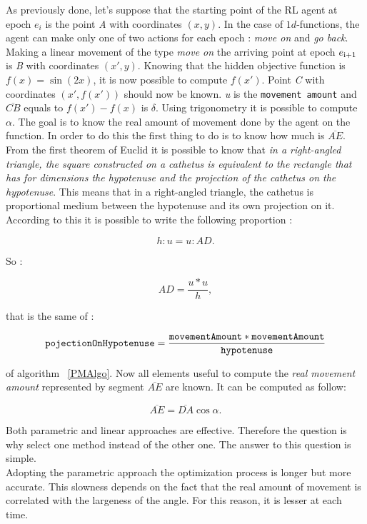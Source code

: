 As previously done, let's suppose that the starting point of the RL agent at epoch $e_i$ is the point \textit{A} with coordinates $(x, y)$. In the case of $1d$-functions, the agent can make only one of two actions for each epoch : \textit{move on} and \textit{go back}. Making a linear movement of the type \textit{move on} the arriving point at epoch $e\textsubscript{i+1}$ is \textit{B} with coordinates $(x', y)$. Knowing that the hidden objective function is $f(x) = \sin(2x)$, it is now possible to compute $f(x')$. Point \textit{C} with coordinates $(x', f(x'))$ should now be known. \textit{u} is the {\tt movement amount} and $\overline{CB}$  equals to $f(x') - f(x)$ is $\delta$. Using trigonometry it is possible to compute $\alpha$. The goal is to know the real amount of movement done by the agent on the function. In order to do this the first thing to do is to know how much is $\overline{AE}$.  From the first theorem of Euclid it is possible to know that \textit{in a right-angled triangle, the square constructed on a cathetus is equivalent to the rectangle that has for dimensions the hypotenuse and the projection of the cathetus on the hypotenuse}. This means that in a right-angled triangle, the cathetus is proportional medium between the hypotenuse and its own projection on it. According to this it is possible to write the following proportion :

\begin{equation}
	h : u =  u : AD.
\end{equation}

So :

\begin{equation}
	AD = \dfrac{u * u}{h},
\end{equation}

that is the same of :

\begin{equation}
	 {\tt pojectionOnHypotenuse} = \dfrac{{\tt movementAmount} * {\tt movementAmount}}{{\tt hypotenuse}}
\end{equation}

of algorithm ~\ref{PMAlgo}. Now all elements useful to compute the \textit{real movement amount} represented by segment $\overline{AE}$ are known. It can be computed as follow:

\begin{equation}
	\overline{AE} = \overline{DA} \cos \alpha.
\end{equation}

Both parametric and linear approaches are effective. Therefore the question is why select one method instead of the other one. The answer to this question is simple. \\ Adopting the parametric approach the optimization process is longer but more accurate. This slowness depends on the fact that the real amount of movement is correlated with the largeness of the angle. For this reason, it is lesser at each time. 

